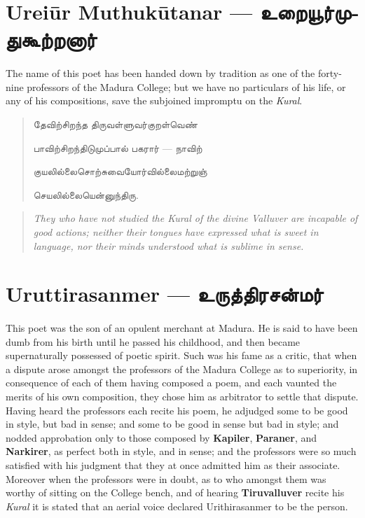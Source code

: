 \documentclass{article}
\newcommand{\TamilText}[1]{\texttamil{#1}}
\newcommand{\TamilBold}[1]{\texttamil{\textbf{#1}}}
\newcommand{\tam}[1]{\TamilText{#1}}
\newcommand{\tambold}[1]{\TamilBold{#1}}
\begin{document}
\section{Urei\={u}r Muthuk\={u}tanar --- \tambold{உறையூர்முதுகூற்றனார்}}
\paragraph{}
The name of this poet has been handed down by tradition as one of the forty-nine professors of the Madura College; but we have no particulars of his life, or any of his compositions, save the subjoined impromptu on the \emph{Kural}.
\begin{quotation}\small
\tam{தேவிற்சிறந்த திருவள்ளுவர்குறள்வெண்}

\tam{பாவிற்சிறந்திடுமுப்பால்‌ பகரார்‌} --- \tam{நாவிற்‌}

\tam{குயலில்லைசொற்சுவையோர்வில்லைமற்றுஞ்‌}

\tam{செயலில்லையென்னுந்திரு}.
\end{quotation}
\begin{quotation}\small
\emph{They who have not studied the Kural of the divine Valluver are incapable of good actions; neither their tongues have expressed what is sweet in language, nor their minds understood what is sublime in sense.}
\end{quotation}

\section{Uruttirasanmer --- \tambold{உருத்திரசன்மர்}}
\paragraph{}
This poet was the son of an opulent merchant at Madura. He is said to have been dumb from his birth until he passed his childhood, and then became supernaturally possessed of poetic spirit. Such was his fame as a critic, that when a dispute arose amongst the professors of the Madura College as to superiority, in consequence of each of them having composed a poem, and each vaunted the merits of his own composition, they chose him as arbitrator to settle that dispute. Having heard the professors each recite his poem, he adjudged some to be good in style, but bad in sense; and some to be good in sense but bad in style; and nodded approbation only to those composed by \textbf{Kapiler}, \textbf{Paraner}, and \textbf{Narkirer}, as perfect both in style, and in sense; and the professors were so much satisfied with his judgment that they at once admitted him as their associate. Moreover when the professors were in doubt, as to who amongst them was worthy of sitting on the College bench, and of hearing \textbf{Tiruvalluver} recite his \emph{Kural} it is stated that an aerial voice declared Urithirasanmer to be the person.
\end{document}
